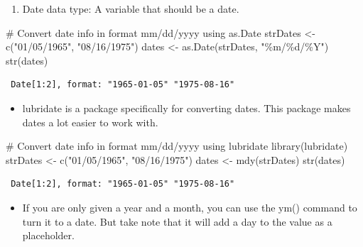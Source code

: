 \documentclass[
  letterpaper,
  DIV=11,
  numbers=noendperiod]{scrreprt}
\newenvironment{Shaded}{\begin{snugshade}}{\end{snugshade}}
\newcommand{\CommentTok}[1]{\textcolor[rgb]{0.37,0.37,0.37}{#1}}
\newcommand{\FunctionTok}[1]{\textcolor[rgb]{0.28,0.35,0.67}{#1}}
\newcommand{\NormalTok}[1]{\textcolor[rgb]{0.00,0.23,0.31}{#1}}
\newcommand{\OtherTok}[1]{\textcolor[rgb]{0.00,0.23,0.31}{#1}}
\newcommand{\StringTok}[1]{\textcolor[rgb]{0.13,0.47,0.30}{#1}}
\providecommand{\tightlist}{%
  \setlength{\itemsep}{0pt}\setlength{\parskip}{0pt}}\usepackage{longtable,booktabs,array}
\begin{document}
\begin{enumerate}
\def\labelenumi{\arabic{enumi}.}
\setcounter{enumi}{4}
\tightlist
\item
  Date data type: A variable that should be a date.
\end{enumerate}

\begin{Shaded}
\begin{Highlighting}[]
\CommentTok{\# Convert date info in format \textquotesingle{}mm/dd/yyyy\textquotesingle{} using as.Date}
\NormalTok{strDates }\OtherTok{\textless{}{-}} \FunctionTok{c}\NormalTok{(}\StringTok{"01/05/1965"}\NormalTok{, }\StringTok{"08/16/1975"}\NormalTok{)}
\NormalTok{dates }\OtherTok{\textless{}{-}} \FunctionTok{as.Date}\NormalTok{(strDates, }\StringTok{"\%m/\%d/\%Y"}\NormalTok{)}
\FunctionTok{str}\NormalTok{(dates)}
\end{Highlighting}
\end{Shaded}

\begin{verbatim}
 Date[1:2], format: "1965-01-05" "1975-08-16"
\end{verbatim}

\begin{itemize}
\tightlist
\item
  lubridate is a package specifically for converting dates. This package
  makes dates a lot easier to work with.
\end{itemize}

\begin{Shaded}
\begin{Highlighting}[]
\CommentTok{\# Convert date info in format \textquotesingle{}mm/dd/yyyy\textquotesingle{} using lubridate}
\FunctionTok{library}\NormalTok{(lubridate)}
\NormalTok{strDates }\OtherTok{\textless{}{-}} \FunctionTok{c}\NormalTok{(}\StringTok{"01/05/1965"}\NormalTok{, }\StringTok{"08/16/1975"}\NormalTok{)}
\NormalTok{dates }\OtherTok{\textless{}{-}} \FunctionTok{mdy}\NormalTok{(strDates)}
\FunctionTok{str}\NormalTok{(dates)}
\end{Highlighting}
\end{Shaded}

\begin{verbatim}
 Date[1:2], format: "1965-01-05" "1975-08-16"
\end{verbatim}

\begin{itemize}
\tightlist
\item
  If you are only given a year and a month, you can use the ym() command
  to turn it to a date. But take note that it will add a day to the
  value as a placeholder.
\end{itemize}
\end{document}
